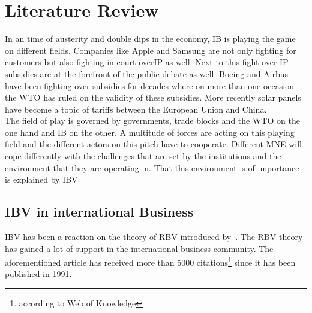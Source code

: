 \chapter{Literature Review}


In an time of austerity and double dips in the economy, \gls{IB} is playing the game on different fields. Companies like Apple and Samsung are not only fighting for customers but also fighting in court over\gls{IP} as well. Next to this fight over \gls{IP} subsidies are at the forefront of the public debate as well. Boeing and Airbus have been fighting over subsidies for decades where on more than one occasion the \gls{WTO} has ruled on the validity of these subsidies. More recently solar panels have become a topic of tariffs between the European Union and China. \\

The field of play is governed by governments, trade blocks and the \gls{WTO} on the one hand and \gls{IB} on the other.
A multitude of forces are acting on this playing field and the different actors on this pitch have to cooperate. 
Different \gls{MNE} will cope differently with the challenges that are set by the institutions and the environment that they are operating in. That this environment is of importance is explained by \gls{IBV}~\cite{Kostova:1999,Meyer:2009,Wang:2012} 

\section{\glsdesc{IBV} in international Business}

\gls{IBV} has been a reaction on the theory of \gls{RBV} introduced by~\cite{Barney:1991}. The \gls{RBV} theory has gained a lot of support in the international business community. The aforementioned article has received more than 5000 citations\footnote{according to Web of Knowledge %
} since it has been published in 1991.\\ 

